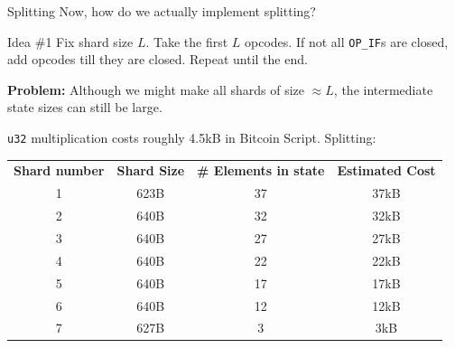 \documentclass{zkdl-presentation-template}
\begin{document}
    \begin{frame}{Splitting}
        Now, how do we actually implement splitting?\pause

        \begin{block}{Idea \#1}
            Fix shard size $L$. Take the first $L$ opcodes. If not all \texttt{OP\_IF}s are closed, add opcodes till they are closed. Repeat until the end.\pause
        \end{block}

        \textbf{Problem:} Although we might make all shards of size $\approx L$, the intermediate state sizes can still be large.\pause

        \begin{example}
            \texttt{u32} multiplication costs roughly 4.5kB in Bitcoin Script. Splitting:
            \begin{table}[H]
            \scriptsize
            \centering
            \begin{tabular}{cccc}
            \textbf{Shard number} & \textbf{Shard Size} & \textbf{\# Elements in state} & \textbf{Estimated Cost} \\
            1 & 623B & 37 & 37kB \\
            2 & 640B & 32 & 32kB \\
            3 & 640B & 27 & 27kB \\
            4 & 640B & 22 & 22kB \\
            5 & 640B & 17 & 17kB \\
            6 & 640B & 12 & 12kB \\
            7 & 627B & 3  & 3kB \\ 
            \end{tabular}
            \label{tab:u32_split}
            \end{table}
        \end{example}
    \end{frame}
\end{document}

